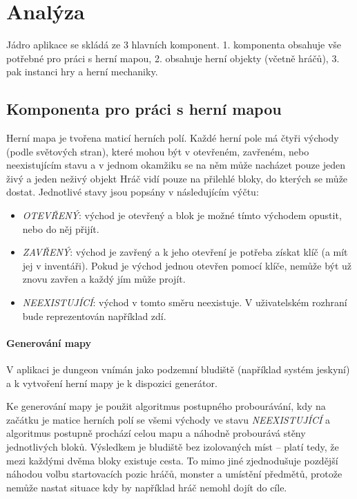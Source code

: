 \documentclass[11pt,a4paper]{scrartcl}
\begin{document}
	\section{Analýza}
	
	Jádro aplikace se skládá ze 3 hlavních komponent. 1. komponenta obsahuje vše potřebné pro práci s herní mapou, 2. obsahuje herní objekty (včetně hráčů), 3. pak instanci hry a herní mechaniky.
	
	\subsection{Komponenta pro práci s herní mapou}
	Herní mapa je tvořena maticí herních polí. Každé herní pole má čtyři východy (podle světových stran), které mohou být v otevřeném, zavřeném, nebo neexistujícím stavu a v jednom okamžiku se na něm může nacházet pouze jeden živý a jeden neživý objekt Hráč vidí pouze na přilehlé bloky, do kterých se může dostat. Jednotlivé stavy jsou popsány v následujícím výčtu:
	
	\begin{itemize}
		\item \textit{OTEVŘENÝ}: východ je otevřený a blok je možné tímto východem opustit, nebo do něj přijít.
		
		\item \textit{ZAVŘENÝ}: východ je zavřený a k jeho otevření je potřeba získat klíč (a mít jej v inventáři). Pokud je východ jednou otevřen pomocí klíče, nemůže být už znovu zavřen a každý jím může projít.
		
		\item \textit{NEEXISTUJÍCÍ}: východ v tomto směru neexistuje. V uživatelském rozhraní bude reprezentován například zdí.
	\end{itemize}

	
	\paragraph{Generování mapy}
	V aplikaci je dungeon vnímán jako podzemní bludiště (například systém jeskyní) a k vytvoření herní mapy je k dispozici generátor. 
	
	Ke generování mapy je použit algoritmus postupného probourávání, kdy na začátku je matice herních polí se všemi východy ve stavu \textit{NEEXISTUJÍCÍ} a algoritmus postupně prochází celou mapu a náhodně probourává stěny jednotlivých bloků. Výsledkem je bludiště bez izolovaných míst -- platí tedy, že mezi každými dvěma bloky existuje cesta. To mimo jiné zjednodušuje pozdější náhodou volbu startovacích pozic hráčů, monster a umístění předmětů, protože nemůže nastat situace kdy by například hráč nemohl dojít do cíle.
	
\end{document}
